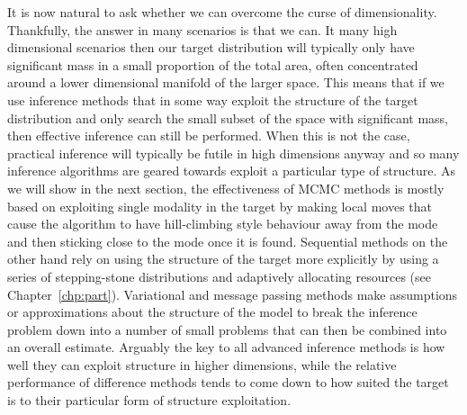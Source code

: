 It is now natural to ask whether we can overcome the curse of dimensionality.  Thankfully, the
answer in many scenarios is that we can.  It many high dimensional scenarios then our target
distribution will typically only have significant mass in a small proportion of the total area, often
concentrated around a lower dimensional manifold of the larger space.  This means that if
we use inference methods that in some way exploit the structure of the target distribution and only
search the small subset of the space with significant mass, then effective inference can still be
performed.  When this is not the case, practical inference will typically be futile in high dimensions anyway
and so many inference algorithms are geared towards exploit a particular type of structure.
As we will show in the next section, the effectiveness of MCMC methods is mostly based on 
exploiting single modality in the target by making local moves that cause the algorithm to have
hill-climbing style behaviour away from the mode and then sticking close to the mode once it
is found.  Sequential \mc methods on the other hand rely on using the structure of the target
more explicitly by using a series of stepping-stone distributions and adaptively allocating
resources (see Chapter~\ref{chp:part}).  Variational and message passing methods make assumptions
or approximations about the structure of the model to break the inference problem down
into a number of small problems that can then be combined into an overall estimate.
Arguably the key to all advanced inference methods is how well they can exploit structure
in higher dimensions, while the relative performance of difference methods tends to come down
to how suited the target is to their particular form of structure exploitation.